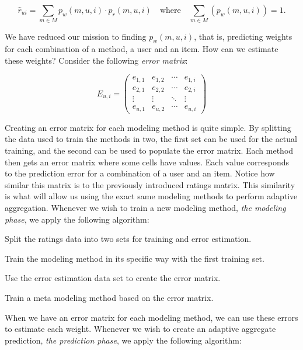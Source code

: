 \begin{equation*}
  \hat{r}_{ui} = \sum_{m \in M} p_{w}(m,u,i) \cdot p_{r}(m,u,i)
  \quad \text{where} \quad
  \sum_{m \in M} (p_{w}(m,u,i)) = 1.
\end{equation*}

We have reduced our mission to finding $p_{w}(m,u,i)$,
that is, predicting weights for each combination of a method, a user and an item.
How can we estimate these weights?
Consider the following \emph{error matrix}:

\begin{equation*}
 E_{u,i} =
 \begin{pmatrix}
    e_{1,1} & e_{1,2} & \cdots & e_{1,i} \\
    e_{2,1} & e_{2,2} & \cdots & e_{2,i} \\
    \vdots  & \vdots  & \ddots & \vdots  \\
    e_{u,1} & e_{u,2} & \cdots & e_{u,i}
 \end{pmatrix}
\end{equation*}

Creating an error matrix for each modeling method is quite simple.
By splitting the data used to train the methods in two,
the first set can be used for the actual training, and the second
can be used to populate the error matrix.
Each method then gets an error matrix where some cells have values.
Each value corresponds to the prediction error for a combination of a user and an item.
Notice how similar this matrix is to the previously introduced ratings matrix.
This similarity is what will allow us using the exact same modeling methods
to perform adaptive aggregation.
Whenever we wish to train a new modeling method,
\emph{the modeling phase}, we apply the following algorithm:

\begin{enumerate*}
  \item Split the ratings data into two sets for training and error estimation.
  \item Train the modeling method in its specific way with the first training set.
  \item Use the error estimation data set to create the error matrix.
  \item Train a meta modeling method based on the error matrix.
\end{enumerate*}

When we have an error matrix for each modeling method, 
we can use these errors to estimate each weight.
Whenever we wish to create an adaptive aggregate prediction,
\emph{the prediction phase},
we apply the following algorithm:

